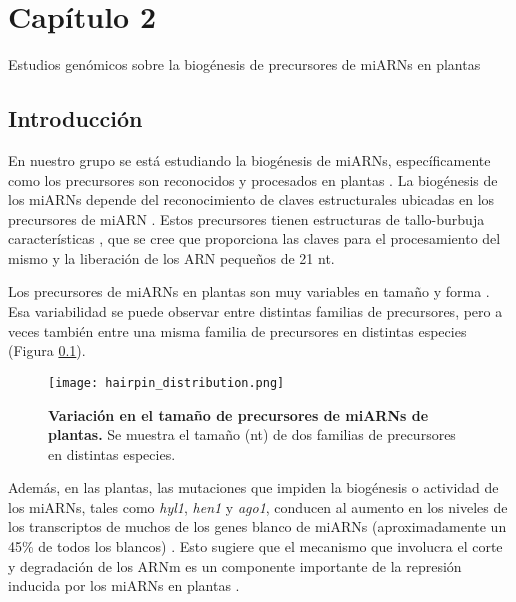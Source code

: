 
\graphicspath{{Chapter2/Figs/}}

\setcounter{chapter}{5}
\chapter*{Capítulo 2} 
\setcounter{figure}{0}
\setcounter{table}{0}
\setcounter{section}{0}

{\LARGE Estudios genómicos sobre la biogénesis de precursores de miARNs en plantas}

\section{Introducción}
En nuestro grupo se está estudiando la biogénesis de miARNs, específicamente como los precursores son reconocidos y procesados en plantas \citep{Bologna2013}.
La biogénesis de los miARNs depende del reconocimiento de claves estructurales ubicadas en los precursores de miARN \citep{pmid21554756,citeulike:8816489,Bologna11112012}.
Estos precursores tienen estructuras de tallo-burbuja características \citep{Jones-Rhoades2006}, que se cree que proporciona las claves para el procesamiento del mismo y la liberación de los ARN pequeños de 21 nt.

Los precursores de miARNs en plantas son muy variables en tamaño y forma \citep{Bologna2013,citeulike:8816489}.
Esa variabilidad se puede observar entre distintas familias de precursores, pero a veces también entre una misma familia de precursores en distintas especies (Figura \ref{fig:hairpin_distribution}).

\begin{figure}[htbp!] 
    \centering    
    \texttt{[image: hairpin\_distribution.png]}
    \caption[Variación en el tamaño de precursores de miARNs de plantas]{
    \textbf{Variación en el tamaño de precursores de miARNs de plantas.} 
    Se muestra el tamaño (nt) de dos familias de precursores en distintas especies.}
    \label{fig:hairpin_distribution}
\end{figure}

Además, en las plantas, las mutaciones que impiden la biogénesis o actividad de los miARNs, tales como \textit{hyl1}, \textit{hen1} y \textit{ago1}, conducen al aumento en los niveles de los transcriptos de muchos de los genes blanco de miARNs (aproximadamente un 45\% de todos los blancos) \citep{Han2004,pmid12747833,pmid16889646,Allen2005207}.
Esto sugiere que el mecanismo que involucra el corte y degradación de los ARNm es un componente importante de la represión inducida por los miARNs en plantas \citep{Jones-Rhoades2006, Voinnet2009669}.

